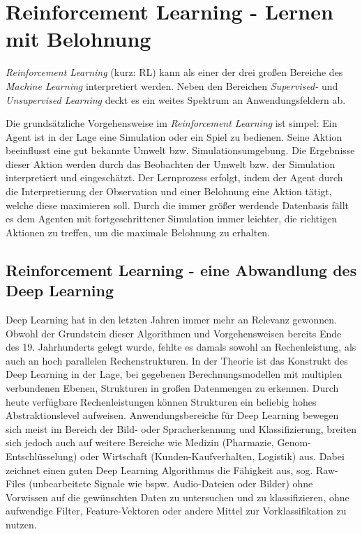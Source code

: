 
\chapter{Reinforcement Learning - Lernen mit Belohnung}
\label{chap:rl}
%

	\textit{Reinforcement Learning} (kurz: RL) kann als einer der drei großen Bereiche des \textit{Machine Learning} interpretiert werden. Neben den Bereichen \textit{Supervised-} und  \textit{Unsupervised Learning} deckt es ein weites Spektrum an Anwendungsfeldern ab.
	
	Die grundsätzliche Vorgehensweise im \textit{Reinforcement Learning} ist simpel: Ein Agent ist in der Lage eine Simulation oder ein Spiel zu bedienen. Seine Aktion beeinflusst eine gut bekannte Umwelt bzw. Simulationsumgebung. Die Ergebnisse dieser Aktion werden durch das Beobachten der Umwelt bzw. der Simulation interpretiert und eingeschätzt. Der Lernprozess erfolgt, indem der Agent durch die Interpretierung der Observation und einer Belohnung eine Aktion tätigt, welche diese maximieren soll. Durch die immer größer werdende Datenbasis fällt es dem Agenten mit fortgeschrittener Simulation immer leichter, die \glqq richtigen\grqq{} Aktionen zu treffen, um die maximale Belohnung zu erhalten.
	

\section{Reinforcement Learning - eine Abwandlung des Deep Learning}
\label{sec:rl_dl}
	Deep Learning hat in den letzten Jahren immer mehr an Relevanz gewonnen. Obwohl der Grundstein dieser Algorithmen und Vorgehensweisen bereits Ende des 19. Jahrhunderts gelegt wurde, fehlte es damals sowohl an Rechenleistung, als auch an hoch parallelen Rechenstrukturen. In der Theorie ist das Konstrukt des Deep Learning in der Lage, bei gegebenen Berechnungsmodellen mit multiplen verbundenen Ebenen, Strukturen in großen Datenmengen zu erkennen. Durch heute verfügbare Rechenleistungen können Strukturen ein beliebig hohes Abstraktionslevel aufweisen. Anwendungsbereiche für Deep Learning bewegen sich meist im Bereich der Bild- oder Spracherkennung und Klassifizierung, breiten sich jedoch auch auf weitere Bereiche wie Medizin (Pharmazie, Genom-Entschlüsselung) oder Wirtschaft (Kunden-Kaufverhalten, Logistik) aus. Dabei zeichnet einen guten Deep Learning Algorithmus die Fähigkeit aus, sog. Raw-Files (unbearbeitete Signale wie bspw. Audio-Dateien oder Bilder) ohne Vorwissen auf die gewünschten Daten zu untersuchen und zu klassifizieren, ohne aufwendige Filter, Feature-Vektoren oder andere Mittel zur Vorklassifikation zu nutzen.
	
